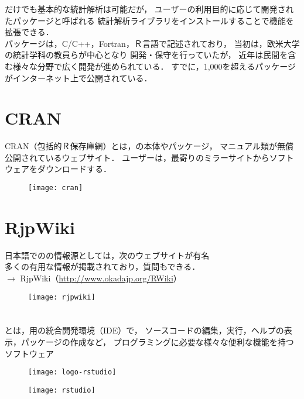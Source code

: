 \documentclass[../main]{subfiles}
\begin{document}
\R だけでも基本的な統計解析は可能だが，
ユーザーの利用目的に応じて開発された\R パッケージと呼ばれる
統計解析ライブラリをインストールすることで機能を拡張できる．\\[3mm]

\R パッケージは，C/C++，Fortran，Ｒ言語で記述されており，
当初は，欧米大学の統計学科の教員らが中心となり
開発・保守を行っていたが，
近年は民間を含む様々な分野で広く開発が進められている．
すでに，1,000を超える\R パッケージがインターネット上で公開されている．

\section{CRAN}

CRAN（包括的Ｒ保存庫網）とは，\R の本体やパッケージ，
マニュアル類が無償公開されているウェブサイト．
ユーザーは，最寄りのミラーサイトからソフトウェアをダウンロードする．


\begin{figure}[H]
  \centering
  \texttt{[image: cran]}
  \label{fig:cran}
\end{figure}

\section{RjpWiki}

日本語での\R の情報源としては，次のウェブサイトが有名\\
多くの有用な情報が掲載されており，質問もできる．\\[5mm]
$\rightarrow$ RjpWiki（\url{http://www.okadajp.org/RWiki}）

\begin{figure}[H]
  \centering
  \texttt{[image: rjpwiki]}
  \label{fig:rjpwiki}
\end{figure}

\section{\RStudio}

\RStudio とは，\R 用の統合開発環境（IDE）で，
ソースコードの編集，実行，ヘルプの表示，パッケージの作成など，
プログラミングに必要な様々な便利な機能を持つソフトウェア\\[3mm]
%
\begin{minipage}{0.45\textwidth}
  \begin{figure}[H]
    \centering
    \texttt{[image: logo-rstudio]}
    \label{fig:logo-rstudio}
  \end{figure}
\end{minipage}
\hspace{3mm}
\begin{minipage}{0.45\textwidth}
  \begin{figure}[H]
    \centering
    \texttt{[image: rstudio]}
    \label{fig:rstudio}
  \end{figure}
\end{minipage}\\[3mm]
\end{document}
